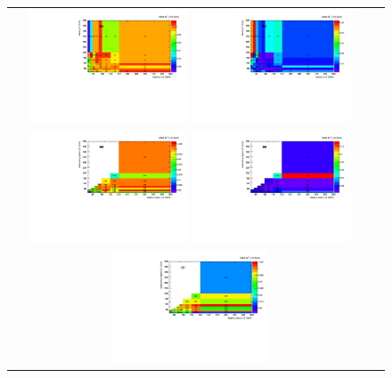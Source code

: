 \begin{figure}[htb]
  \begin{center}
    \begin{tabular}{cc}
      \includegraphics[width=0.45\textwidth]{fig_2018_TrigSF/h2D_lepABpt_emu.pdf}
      \includegraphics[width=0.45\textwidth]{fig_2018_TrigSF/h2D_lepABpt_emu_BinErrors.pdf}\\       
      \includegraphics[width=0.45\textwidth]{fig_2018_TrigSF/h2D_lepABpt_ee.pdf}
      \includegraphics[width=0.45\textwidth]{fig_2018_TrigSF/h2D_lepABpt_ee_BinErrors.pdf}\\
      \includegraphics[width=0.45\textwidth]{fig_2018_TrigSF/h2D_lepABpt_mumu.pdf}

\end{tabular}
\end{center}
\end{figure}
